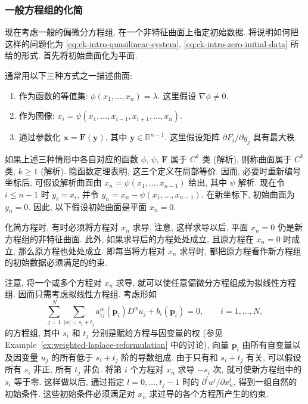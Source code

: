 \subsubsection{一般方程组的化简}\label{subsec:general-system-reduction}

现在考虑一般的偏微分方程组, 在一个非特征曲面上指定初始数据. 将说明如何把这样的问题化为 \eqref{eq:ck-intro-quasilinear-system}, \eqref{eq:ck-intro-zero-initial-data} 所给的形式. 首先将初始曲面化为平面.

通常用以下三种方式之一描述曲面:
\begin{enumerate}
\item 作为函数的等值集: $\phi(x_1,\ldots,x_n)=\lambda$. 这里假设 $\nabla\phi\ne0$.
\item 作为图像: $x_i=\psi(x_1,\ldots,x_{i-1},x_{i+1},\ldots,x_n)$.
\item 通过参数化 $\bm{x}=\bm{F}(\bm{y})$, 其中 $\bm{y}\in\mathbb{R}^{n-1}$. 这里假设矩阵 $\partial F_i/\partial y_j$ 具有最大秩.
\end{enumerate}

如果上述三种情形中各自对应的函数 $\phi$, $\psi$, $\bm{F}$ 属于 $C^k$ 类 (解析), 则称曲面属于 $C^k$ 类, $k\geq1$ (解析). 隐函数定理表明, 这三个定义在局部等价. 因而, 必要时重新编号坐标后, 可假设解析曲面由 $x_n=\psi(x_1,\ldots,x_{n-1})$ 给出, 其中 $\psi$ 解析. 现在令 $i\leq n-1$ 时 $y_i=x_i$, 并令 $y_n=x_n-\psi(x_1,\ldots,x_{n-1})$. 在新坐标下, 初始曲面为 $y_n=0$. 因此, 以下假设初始曲面是平面 $x_n=0$.

化简方程时, 有时必须将方程对 $x_n$ 求导. 注意, 这样求导以后, 平面 $x_n=0$ 仍是新方程组的非特征曲面. 此外, 如果求导后的方程处处成立, 且原方程在 $x_n=0$ 时成立, 那么原方程也处处成立. 即每当将方程对 $x_n$ 求导时, 都把原方程看作新方程组的初始数据必须满足的约束.

注意, 将一个或多个方程对 $x_n$ 求导, 就可以使任意偏微分方程组成为拟线性方程组. 因而只需考虑拟线性方程组. 考虑形如
\begin{equation}\label{eq:general-weighted-quasilinear-system}
\sum_{j=1}^N\sum_{|\alpha|=s_i+t_j}a_{ij}^{\alpha}(\bm{p}_i)D^\alpha u_j+b_i(\bm{p}_i)=0,\qquad i=1,\ldots,N,
\end{equation}
的方程组, 其中 $s_i$ 和 $t_j$ 分别是赋给方程与因变量的权 (参见 Example~\ref{ex:weighted-laplace-reformulation} 中的讨论), 向量 $\bm{p}_i$ 由所有自变量以及因变量 $u_j$ 的所有低于 $s_i+t_j$ 阶的导数组成. 由于只有和 $s_i+t_j$ 有关, 可以假设所有 $s_i$ 非正, 所有 $t_j$ 非负. 将第 $i$ 个方程对 $x_n$ 求导 $-s_i$ 次, 就可使新方程组中的 $s_i$ 等于零. 这样做以后, 通过指定 $l=0,\ldots,t_j-1$ 时的 $\partial^l u^j/\partial x_n^l$, 得到一组自然的初始条件. 这些初始条件必须满足对 $x_n$ 求过导的各个方程所产生的约束.

